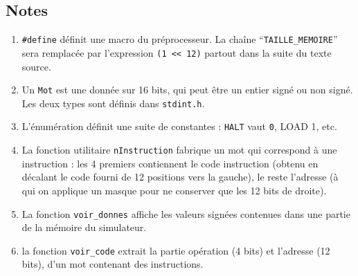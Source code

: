 \documentclass[10pt]{article}
\begin{document}
\subsection{Notes}

\begin{enumerate}
\item \texttt{\#define} définit une macro du préprocesseur. La chaîne
  ``\texttt{TAILLE\_MEMOIRE}'' sera remplacée par l'expression
  \verb/(1 << 12)/ partout dans la suite du texte source.
\item Un \texttt{Mot} est une donnée sur 16 bits, qui peut être un
  entier signé ou non signé.  Les deux types sont définis dans
  \texttt{stdint.h}.
\item L'énumération définit une suite de constantes : \texttt{HALT} vaut \texttt{0}, LOAD 1, etc.
\item La fonction utilitaire \texttt{nInstruction} fabrique un mot qui
  correspond à une instruction : les 4 premiers contiennent le code
  instruction (obtenu en décalant le code fourni de 12 positions vers
  la gauche), le reste l'adresse (à qui on applique un masque pour ne
  conserver que les 12 bits de droite).

\item La fonction \texttt{voir\_donnes} affiche les valeurs signées contenues
dans une partie de la mémoire du simulateur.
\item la fonction \texttt{voir\_code} extrait la partie opération (4 bits) et l'adresse (12 bits), d'un mot contenant des instructions. 

\end{enumerate}
\end{document}
